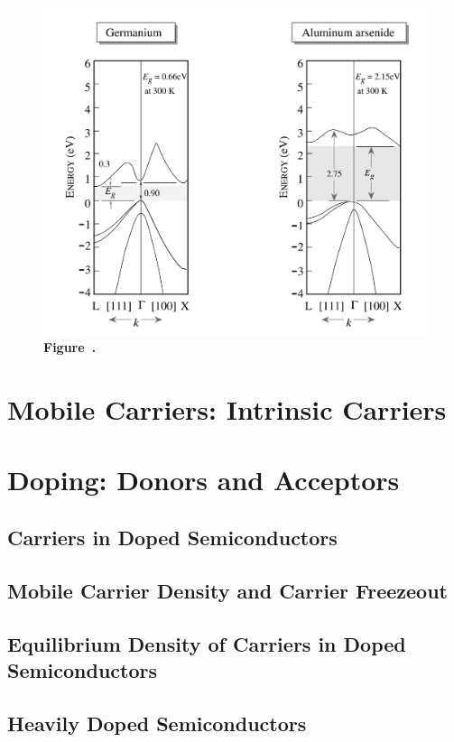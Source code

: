 \begin{figure}[h!]
\begin{minipage}{0.64\textwidth}
		\includegraphics[width=\textwidth]{img/Germanium&Aluminium.png}
		\\[0.5em]
		\textbf{Figure~\thefigure.} 
		\label{fig:Germanium&Aluminium}
	\end{minipage}
\end{figure}



\section{Mobile Carriers: Intrinsic Carriers}
\section{Doping: Donors and Acceptors}
\subsection{Carriers in Doped Semiconductors}
\subsection{Mobile Carrier Density and Carrier Freezeout}
\subsection{Equilibrium Density of Carriers in Doped Semiconductors}
\subsection{Heavily Doped Semiconductors}
